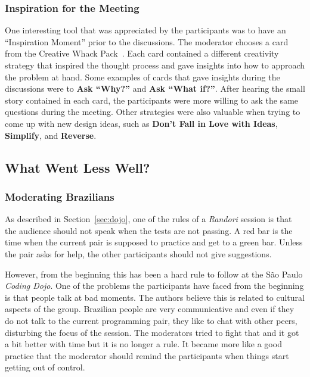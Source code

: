 \subsubsection{Inspiration for the Meeting}

One interesting tool that was appreciated by the participants was
to have an ``Inspiration Moment'' prior to the discussions. The moderator
chooses a card from the Creative Whack Pack~\cite{Creative}. Each
card contained a different creativity strategy that inspired the thought
process and gave insights into how to approach the problem at hand. Some
examples of cards that gave insights during the discussions were to
\textbf{Ask ``Why?''} and \textbf{Ask ``What if?''}. After hearing the
small story contained in each card, the participants were more willing
to ask the same questions during the meeting. Other strategies were also
valuable when trying to come up with new design ideas, such as \textbf{Don't
Fall in Love with Ideas}, \textbf{Simplify}, and \textbf{Reverse}. 

\subsection{What Went Less Well?}\label{ssub:less_well}

\subsubsection{Moderating Brazilians}

As described in Section~\ref{sec:dojo}, one of the rules of a
\emph{Randori} session is that the audience should not speak when
the tests are not passing. A red bar is the time when the current
pair is supposed to practice and get to a green bar. Unless the pair
asks for help, the other participants should not give suggestions.

However, from the beginning this has been a hard rule to follow at
the São Paulo \emph{Coding Dojo}. One of the problems the participants
have faced from the beginning is that people talk at bad moments. The authors
believe this is related to cultural aspects of the group. Brazilian people are
very communicative and even if they do not talk to the current programming
pair, they like to chat with other peers, disturbing the focus of the session.
The moderators tried to fight that and it got a bit better with time but it is no
longer a rule. It became more like a good practice that the moderator should
remind the participants when things start getting out of control.

